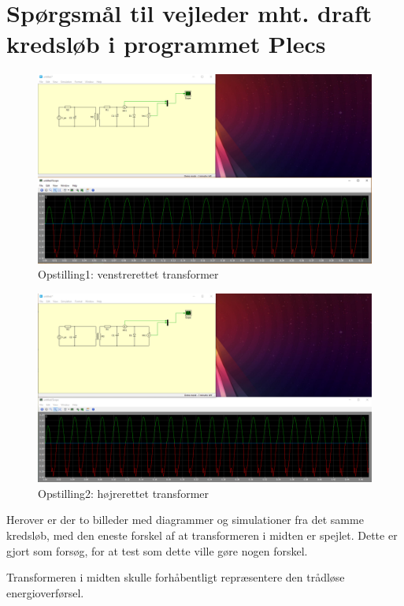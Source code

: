 \documentclass[a4paper,11pt]{memoir}
\begin{document}
\chapter{Spørgsmål til vejleder mht. draft kredsløb i programmet Plecs}

\newpage

\begin{figure}[htbp]
\centering
\includegraphics[width=13cm]{Schematics/161031_Plecs1.png}
\caption{Opstilling1: venstrerettet transformer}
\end{figure}

\begin{figure}[H]
\centering
\includegraphics[width=1\textwidth]{Schematics/161031_Plecs2.png}
\caption{Opstilling2: højrerettet transformer}
\end{figure}
\newpage

Herover er der to billeder med diagrammer og simulationer fra det samme kredsløb, med den eneste forskel af at transformeren i midten er spejlet. Dette er gjort som forsøg, for at test som dette ville gøre nogen forskel.

Transformeren i midten skulle forhåbentligt repræsentere den trådløse energioverførsel.
\end{document}
